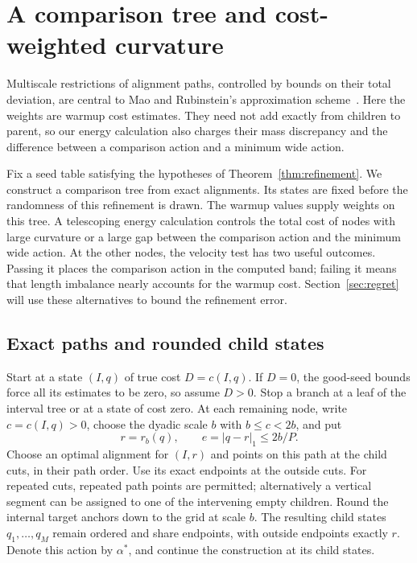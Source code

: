 \section{A comparison tree and cost-weighted curvature}\label{sec:comparison}

Multiscale restrictions of alignment paths, controlled by bounds on their
total deviation, are central to Mao and
Rubinstein's approximation scheme~\cite[Sections~2.3 and~6.1]{MaoRubinstein2026}.
Here the weights are warmup cost estimates. They need not add exactly from
children to parent, so our energy calculation also charges their mass
discrepancy and the difference between a comparison action and a minimum
wide action.

Fix a seed table satisfying the hypotheses of Theorem~\ref{thm:refinement}.
We construct a comparison tree from exact alignments.  Its states are fixed
before the randomness of this refinement is drawn.  The warmup values supply
weights on this tree.  A telescoping energy calculation controls the total
cost of nodes with large curvature or a large gap between the comparison
action and the minimum wide action.  At the other nodes, the velocity test
has two useful outcomes.  Passing it places the comparison action in the
computed band; failing it means that length imbalance nearly accounts for
the warmup cost.  Section~\ref{sec:regret} will use these alternatives to
bound the refinement error.

\subsection{Exact paths and rounded child states}

Start at a state $(I,q)$ of true cost $D=c(I,q)$.  If $D=0$, the good-seed
bounds force all its estimates to be zero, so assume $D>0$.  Stop a branch at
a leaf of the interval tree or at a state of cost zero.  At each remaining
node, write $c=c(I,q)>0$, choose the dyadic scale $b$ with $b\le c<2b$, and put
\[
 r=r_b(q),\qquad e=|q-r|_1\le 2b/P.
\]
Choose an optimal alignment for $(I,r)$ and points on this path at the child
cuts, in their path order.  Use its exact endpoints at the outside cuts.
For repeated cuts, repeated path points are permitted; alternatively a
vertical segment can be assigned to one of the intervening empty children.
Round the internal target anchors down to the grid at scale $b$.  The resulting
child states $q_1,\ldots,q_M$ remain ordered and share endpoints, with outside
endpoints exactly $r$.  Denote this action by $\alpha^*$, and continue the
construction at its child states.

